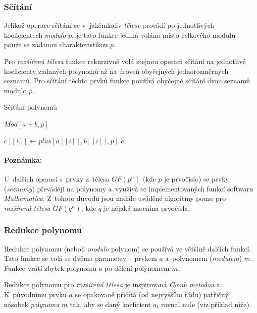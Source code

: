 \documentclass[thesis=M,czech,hidelinks]{FITthesis}[2012/06/26]
\newcommand{\0}{{\textcolor[gray]{0.75}{0}}}
\newenvironment{algoritmus}{
    \floatname{algorithm}{Algoritmus}
    \begin{algorithm}
}{\end{algorithm}}
\begin{document}
\subsubsection{Sčítání}
Jelikož operace sčítání se v~jakémkoliv \emph{tělese} provádí po jednotlivých
koeficientech \emph{modulo} $p$, je tato funkce jediná volána místo celkového
modulu pouze se zadanou charakteristikou $p$.

Pro \emph{rozšířená tělesa} funkce rekurzivně volá stejnou operaci sčítání na
jednotlivé koeficienty zadaných polynomů až na úroveň obyčejných jednorozměrných
seznamů. Pro sčítání těchto prvků funkce používá obyčejné sčítání dvou seznamů
modulo $p$.

\begin{algoritmus}[!ht]
    \caption{Sčítání polynomů}
    \begin{algorithmic}[1]
        \State \Return $Mod[a+b,p]$
     \EndFunction
    \end{algorithmic}
    \begin{algorithmic}[1]
            \State $c[[i]] \gets plus[a[[i]],b[[i]],p]$
        \EndFor
        \State \Return $c$
     \EndFunction
    \end{algorithmic}
\end{algoritmus}

\paragraph{Poznámka:} U~dalších operací s~prvky z~tělesa $GF(p^n)$ (kde $p$ je
prvočíslo) se prvky (\emph{seznamy}) převádějí na polynomy a~využívá se
implementovaných funkcí softwaru \emph{Mathematica}. Z~tohoto důvodu jsou nadále
uváděné algoritmy pouze pro \emph{rozšířená tělesa} $GF(q^n)$, kde $q$ je nějaká
mocnina prvočísla.


\subsubsection{Redukce polynomu}

Redukce polynomu (neboli \emph{modulo} polynom) se používá ve většině dalších
funkcí. Tato funkce se volá se dvěma parametry -- prvkem $a$ a~polynomem
(\emph{modulem}) $m$. Funkce vrátí zbytek polynomu $a$ po dělení polynomem $m$.

Redukce polynomu pro \emph{rozšířená tělesa} je inspirovaná \emph{Comb metodou}
z~\cite{Merchan}. K~původnímu prvku $a$ se opakovaně přičítá (od nejvyššího
řádu) patřičný násobek \emph{polynomu} $m$ tak, aby se daný koeficient $a_i$
rovnal nule (viz příklad níže).
\end{document}
